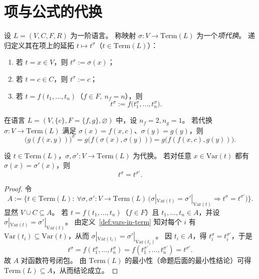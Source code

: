 \documentclass[lang=cn,a4paper,newtx,section]{elegantbook}
\begin{document}
\section{项与公式的代换}

 \begin{definition}[项的代换]
 \label{substitution-on-terms}
 设 $L=(V,C,F,R)$ 为一阶语言。
 称映射 $\sigma:V\to\mathrm{Term}(L)$ 为一个\emph{项代换}。
 递归定义其在项上的延拓 $t\longmapsto t^{\sigma}$（$t\in\mathrm{Term}(L)$）：
 \begin{enumerate}
   \item 若 $t=x\in V$，则 $t^{\sigma}:=\sigma(x)$；
   \item 若 $t=c\in C$，则 $t^{\sigma}:=c$；
   \item 若 $t=f(t_1,\dots,t_n)$（$f\in F,\ n_f=n$），则
   \[
     t^{\sigma}:=f\bigl(t_1^{\sigma},\dots,t_n^{\sigma}\bigr).
   \]
 \end{enumerate}
 \end{definition}

 \begin{example}
 在语言 $L=(V,\{c\},F=\{f,g\},\varnothing)$ 中，设 $n_f=2,n_g=1$。
 若代换 $\sigma:V\to\mathrm{Term}(L)$ 满足 $\sigma(x)=f(x,c)$、$\sigma(y)=g(y)$，则
 \[
   \bigl(g(f(x,y))\bigr)^{\sigma}=g\bigl(f(\sigma(x),\sigma(y))\bigr)=g\bigl(f(f(x,c),g(y))\bigr).
 \]
 \end{example}

 \begin{lemma}[项代换只依赖其出现变量]
 \label{substitution-depends-on-vars}
 设 $t\in\mathrm{Term}(L)$，$\sigma,\sigma':V\to\mathrm{Term}(L)$ 为代换。
 若对任意 $x\in\mathrm{Var}(t)$ 都有 $\sigma(x)=\sigma'(x)$，则
 \[
   t^{\sigma}=t^{\sigma'}.
 \]
 \end{lemma}

 \begin{proof}
 令
 \[
   A:=\bigl\{t\in\mathrm{Term}(L):\ \forall\sigma,\sigma':V\to\mathrm{Term}(L)\,\bigl(\sigma|_{\mathrm{Var}(t)}=\sigma'|_{\mathrm{Var}(t)}\Rightarrow t^{\sigma}=t^{\sigma'}\bigr)\bigr\}.
 \]
 显然 $V\cup C\subseteq A$。
 若 $t=f(t_1,\dots,t_n)$（$f\in F$）且 $t_1,\dots,t_n\in A$，并设 $\sigma|_{\mathrm{Var}(t)}=\sigma'|_{\mathrm{Var}(t)}$。
 由定义~\ref{def:vars-in-term} 知对每个 $i$ 有 $\mathrm{Var}(t_i)\subseteq\mathrm{Var}(t)$，从而 $\sigma|_{\mathrm{Var}(t_i)}=\sigma'|_{\mathrm{Var}(t_i)}$。
 因 $t_i\in A$，得 $t_i^{\sigma}=t_i^{\sigma'}$，于是
 \[
   t^{\sigma}=f(t_1^{\sigma},\dots,t_n^{\sigma})=f(t_1^{\sigma'},\dots,t_n^{\sigma'})=t^{\sigma'}.
 \]
 故 $A$ 对函数符号闭包。
 由 $\mathrm{Term}(L)$ 的最小性（命题后面的最小性结论）可得 $\mathrm{Term}(L)\subseteq A$，从而结论成立。
 \end{proof}
\end{document}
